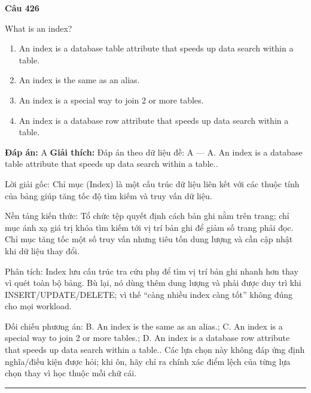 \documentclass[11pt,a4paper]{article}
\newenvironment{question}[1]{%
  \par\vspace{1em}\noindent\textbf{\large Câu #1}\par\vspace{0.4em}
}{%
  \par\vspace{1em}\hrule\vspace{0.6em}
}
\newenvironment{choices}{%
  \begin{enumerate}[label=\textbf{\Alph*.},leftmargin=2.2em,itemsep=2pt,topsep=3pt]
}{%
  \end{enumerate}
}
\newcommand{\choice}{\item}
\begin{document}
\begin{question}{426}
What is an index?
\begin{choices}
\choice An index is a database table attribute that speeds up data search within a table.
\choice An index is the same as an alias.
\choice An index is a special way to join 2 or more tables.
\choice An index is a database row attribute that speeds up data search within a table.
\end{choices}
\textbf{Đáp án:} A
\textbf{Giải thích:} Đáp án theo dữ liệu đề: A — A. An index is a database table attribute that speeds up data search within a table..

Lời giải gốc: Chỉ mục (Index) là một cấu trúc dữ liệu liên kết với các thuộc tính của bảng giúp tăng tốc độ tìm kiếm và truy vấn dữ liệu.

Nền tảng kiến thức: Tổ chức tệp quyết định cách bản ghi nằm trên trang; chỉ mục ánh xạ giá trị khóa tìm kiếm tới vị trí bản ghi để giảm số trang phải đọc. Chỉ mục tăng tốc một số truy vấn nhưng tiêu tốn dung lượng và cần cập nhật khi dữ liệu thay đổi.

Phân tích: Index lưu cấu trúc tra cứu phụ để tìm vị trí bản ghi nhanh hơn thay vì quét toàn bộ bảng. Bù lại, nó dùng thêm dung lượng và phải được duy trì khi INSERT/UPDATE/DELETE; vì thế “càng nhiều index càng tốt” không đúng cho mọi workload.

Đối chiếu phương án: B. An index is the same as an alias.; C. An index is a special way to join 2 or more tables.; D. An index is a database row attribute that speeds up data search within a table.. Các lựa chọn này không đáp ứng định nghĩa/điều kiện được hỏi; khi ôn, hãy chỉ ra chính xác điểm lệch của từng lựa chọn thay vì học thuộc mỗi chữ cái.
\end{question}
\end{document}

